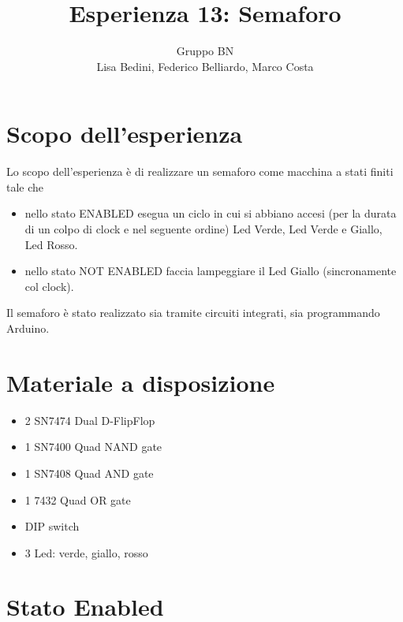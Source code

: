\documentclass[10pt,a4paper]{article}
\author{Gruppo BN \\Lisa Bedini,  Federico Belliardo, Marco Costa}
\title{Esperienza 13: Semaforo}
\begin{document}
\maketitle


\section{Scopo dell'esperienza}
Lo scopo dell'esperienza è di realizzare un semaforo come macchina a stati finiti tale che
\begin{itemize}
\item nello stato ENABLED esegua un ciclo in cui si abbiano accesi (per la durata di un colpo di clock e nel seguente ordine) Led Verde, Led Verde e Giallo, Led Rosso.
\item nello stato NOT ENABLED faccia lampeggiare il Led Giallo (sincronamente  col clock).
\end{itemize}
Il semaforo è stato realizzato sia tramite circuiti integrati, sia programmando Arduino.

\section{Materiale a disposizione}
\begin{itemize}
\item 2 SN7474 Dual D-FlipFlop
\item 1 SN7400 Quad NAND gate
\item 1 SN7408 Quad AND gate
\item 1 7432 Quad OR gate
\item DIP switch
\item 3 Led: verde, giallo, rosso
\end{itemize}

\section{Stato Enabled}
\end{document}
